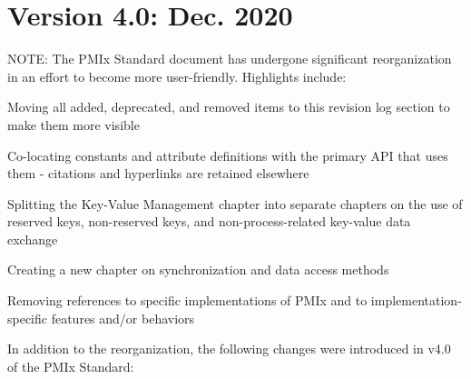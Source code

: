 \section{Version 4.0: Dec. 2020}

NOTE: The PMIx Standard document has undergone significant reorganization in an
effort to become more user-friendly. Highlights include:

\begin{compactitemize}
    \item Moving all added, deprecated, and removed items to this revision log
    section to make them more visible
    \item Co-locating constants and attribute definitions with the primary
    API that uses them - citations and hyperlinks are retained elsewhere
    \item Splitting the Key-Value Management chapter into separate chapters on
    the use of reserved keys, non-reserved keys, and non-process-related
    key-value data exchange
    \item Creating a new chapter on synchronization and data access methods
    \item Removing references to specific implementations of \ac{PMIx} and to implementation-specific features
    and/or behaviors
\end{compactitemize}

In addition to the reorganization, the following changes were introduced in v4.0 of the PMIx Standard:

